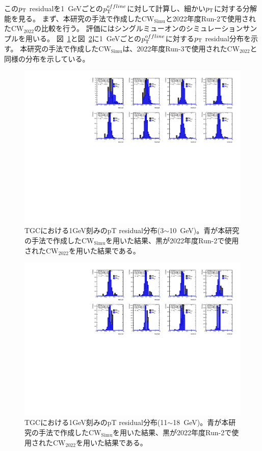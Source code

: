 この$p_{\rm{T}}$ residualを1~GeVごとの$p_{\rm{T}}^{offline}$に対して計算し、細かい$p_{\rm{T}}$に対する分解能を見る。
まず、本研究の手法で作成した$\mathrm{CW_{Simu}}$と2022年度Run-2で使用された$\mathrm{CW_{2022}}$の比較を行う。
評価にはシングルミューオンのシミュレーションサンプルを用いる。
図~\ref{residual_MC_3_10}と図~\ref{residual_MC_11_18}に1~GeVごとの$p_{\rm{T}}^{offline}$に対する$p_{\rm{T}}$ residual分布を示す。
本研究の手法で作成した$\mathrm{CW_{Simu}}$は、2022年度Run-3で使用された$\mathrm{CW_{2022}}$と同様の分布を示している。
\begin{figure}[htb]
  \centering
  \hspace*{-1cm}
  \includegraphics[clip, width=16cm]{fig/5/residual_MC_3_10.pdf}
  \caption{TGCにおける1GeV刻みのpT residual分布(3$\sim$10~GeV)。青が本研究の手法で作成した$\mathrm{CW_{Simu}}$を用いた結果、黒が2022年度Run-2で使用された$\mathrm{CW_{2022}}$を用いた結果である。}
  \label{residual_MC_3_10}
\end{figure}
\begin{figure}[htb]
  \centering
  \hspace*{-1cm}
  \includegraphics[clip, width=16cm]{fig/5/residual_MC_11_18.pdf}
  \caption{TGCにおける1GeV刻みのpT residual分布(11$\sim$18~GeV)。青が本研究の手法で作成した$\mathrm{CW_{Simu}}$を用いた結果、黒が2022年度Run-2で使用された$\mathrm{CW_{2022}}$を用いた結果である。}
  \label{residual_MC_11_18}
\end{figure}



